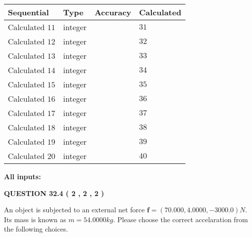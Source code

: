\documentclass[12pt]{article}
\begin{document}
  
\noindent\begin{tabular}{|l|l|l|l|}
\hline
 Sequential & Type & Accuracy & Calculated \\ 
\hline
 
 
  Calculated $           11 $ & integer &  & 
  $ 31 $ 
 \\  \hline  
 
 
  Calculated $           12 $ & integer &  & 
  $ 32 $ 
 \\  \hline  
 
 
  Calculated $           13 $ & integer &  & 
  $ 33 $ 
 \\  \hline  
 
 
  Calculated $           14 $ & integer &  & 
  $ 34 $ 
 \\  \hline  
 
 
  Calculated $           15 $ & integer &  & 
  $ 35 $ 
 \\  \hline  
 
 
  Calculated $           16 $ & integer &  & 
  $ 36 $ 
 \\  \hline  
 
 
  Calculated $           17 $ & integer &  & 
  $ 37 $ 
 \\  \hline  
 
 
  Calculated $           18 $ & integer &  & 
  $ 38 $ 
 \\  \hline  
 
 
  Calculated $           19 $ & integer &  & 
  $ 39 $ 
 \\  \hline  
 
 
  Calculated $           20 $ & integer &  & 
  $ 40 $ 
 \\  \hline  
 \end{tabular}
   
   
   
   
\noindent\vspace{0.1in}\hspace{-0.08in} {\textbf{\Large{All inputs: }}}
   
   
  
\vspace{0.2in}
  
{\textbf{\Large{QUESTION
32.4 
 (           2 ,           2 ,           2 )
}}}
  
  
 
An object is subjected to an external net force $\mathbf{f}=(
70.000 ,
4.0000,
-3000.0  )N$. Its mass is known as
$m= %
54.0000  kg$. Please choose the correct accelaration
from the following choices.
 
\end{document}
